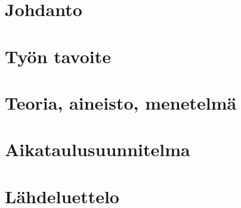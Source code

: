 \documentclass[12pt]{article}
\title{}
\author{Ville Kumpulainen}
\begin{document}

\tableofcontents
\newpage

\section{Johdanto}

\section{Työn tavoite}

\section{Teoria, aineisto, menetelmä}

\section{Aikataulusuunnitelma}

\section*{Lähdeluettelo}

\end{document}
